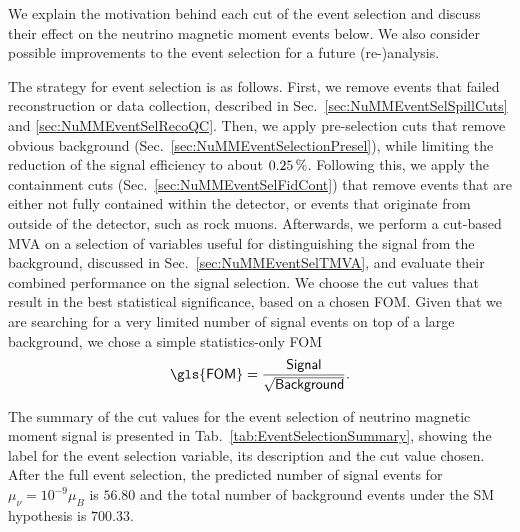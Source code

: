 We explain the motivation behind each cut of the event selection and discuss their effect on the neutrino magnetic moment events below. We also consider possible improvements to the event selection for a future (re-)analysis.

The strategy for event selection is as follows. First, we remove events that failed reconstruction or data collection, described in Sec.~\ref{sec:NuMMEventSelSpillCuts} and \ref{sec:NuMMEventSelRecoQC}. Then, we apply pre-selection cuts that remove obvious background (Sec.~\ref{sec:NuMMEventSelectionPresel}), while limiting the reduction of the signal efficiency to about $\unit[0.25]{\%}$. Following this, we apply the containment cuts (Sec.~\ref{sec:NuMMEventSelFidCont}) that remove events that are either not fully contained within the detector, or events that originate from outside of the detector, such as rock muons. Afterwards, we perform a cut-based \gls{MVA} on a selection of variables useful for distinguishing the signal from the background, discussed in Sec.~\ref{sec:NuMMEventSelTMVA}, and evaluate their combined performance on the signal selection. We choose the cut values that result in the best statistical significance, based on a chosen \gls{FOM}. Given that we are searching for a very limited number of signal events on top of a large background, we chose a simple statistics-only \gls{FOM}
\begin{equation}\label{eq:NuMMFOM}
\textsf{\gls{FOM}} = \frac{\textsf{Signal}}{\sqrt{\textsf{Background}}}.
\end{equation}

The summary of the cut values for the event selection of neutrino magnetic moment signal is presented in Tab.~\ref{tab:EventSelectionSummary}, showing the label for the event selection variable, its description and the cut value chosen. After the full event selection, the predicted number of signal events for $\mu_\nu=10^{-9}\mu_B$ is $56.80$ and the total number of background events under the \gls{SM} hypothesis is $700.33$.

